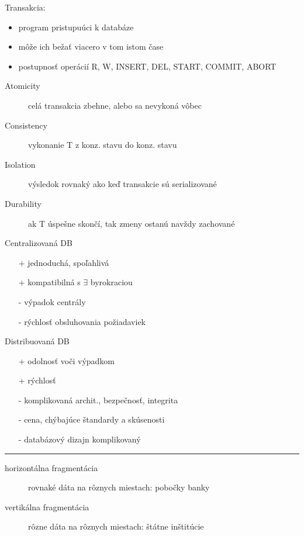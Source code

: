 \documentclass[a4paper]{report}
\begin{document}
Transakcia:
\begin{itemize}
 \item program pristupuúci k databáze
 \item môže ich bežať viacero v tom istom čase
 \item postupnosť operácií R, W, INSERT, DEL, START, COMMIT, ABORT
\end{itemize}

\begin{description}
\item[Atomicity]
celá transakcia zbehne, alebo sa nevykoná vôbec

\item[Consistency]
vykonanie T z konz. stavu do konz. stavu

\item[Isolation]
výsledok rovnaký ako keď transakcie sú serializované

\item[Durability]
ak T úspešne skončí, tak zmeny ostanú navždy zachované
\end{description}

\begin{minipage}[t]{0.5\textwidth}
\centerline{Centralizovaná DB}
\begin{itemize}
 \item[+] jednoduchá, spoľahlivá
 \item[+] kompatibilná s $\exists$ byrokraciou
 \item[-] výpadok centrály
 \item[-] rýchlosť obsluhovania požiadaviek
\end{itemize}
\end{minipage}
\begin{minipage}[t]{0.5\textwidth}
\centerline{Distribuovaná DB}
\begin{itemize}
 \item[+] odolnosť voči výpadkom
 \item[+] rýchlosť
 \item[-] komplikovaná archit., bezpečnosť, integrita
 \item[-] cena, chýbajúce štandardy a skúsenosti
 \item[-] databázový dizajn komplikovaný
\end{itemize}
\end{minipage}

\hrule

\begin{description}
\item[horizontálna fragmentácia]
rovnaké dáta na rôznych miestach: pobočky banky

\item[vertikálna fragmentácia]
rôzne dáta na rôznych miestach: štátne inštitúcie
\end{description}
\end{document}
